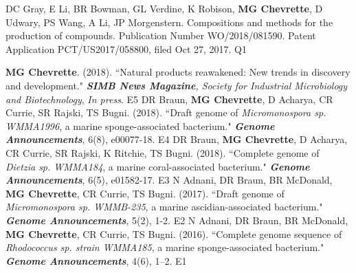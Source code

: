 
\begin{cvpubs}
  \cvpub
    {DC Gray, E Li, BR Bowman, GL Verdine, K Robison, \textbf{MG Chevrette}, D Udwary, PS Wang, A Li, JP Morgenstern. Compositions and methods for the production of compounds. Publication Number WO/2018/081590. Patent Application PCT/US2017/058800, filed Oct 27, 2017. \textbf{\textit{}} }  %
    {Q1} %
\end{cvpubs}


\begin{cvpubs}
  \cvpub
    {\textbf{MG Chevrette}. (2018). ``Natural products reawakened: New trends in discovery and development." \textit{\textbf{SIMB News Magazine}, Society for Industrial Microbiology and Biotechnology}, \textit{In press}. }  %
    {E5} %
  \cvpub
    {DR Braun, \textbf{MG Chevrette}, D Acharya, CR Currie, SR Rajski, TS Bugni. (2018). ``Draft genome of \textit{Micromonospora sp. WMMA1996}, a marine sponge-associated bacterium." \textit{\textbf{Genome Announcements}}, 6(8), e00077-18. \textbf{\textit{}} }  %
    {E4} %
  \cvpub
    {DR Braun, \textbf{MG Chevrette}, D Acharya, CR Currie, SR Rajski, K Ritchie, TS Bugni. (2018). ``Complete genome of \textit{Dietzia sp. WMMA184}, a marine coral-associated bacterium." \textit{\textbf{Genome Announcements}}, 6(5), e01582-17. \textbf{\textit{}} } %
    {E3} %
  \cvpub
    {N Adnani, DR Braun, BR McDonald, \textbf{MG Chevrette}, CR Currie, TS Bugni. (2017). ``Draft genome of \textit{Micromonospora sp. WMMB-235}, a marine ascidian-associated bacterium." \textit{\textbf{Genome Announcements}}, 5(2), 1-2. \textbf{\textit{}} } %
    {E2} %
  \cvpub
  {N Adnani, DR Braun, BR McDonald, \textbf{MG Chevrette}, CR Currie, TS Bugni. (2016). ``Complete genome sequence of \textit{Rhodococcus sp. strain WMMA185}, a marine sponge-associated bacterium." \textit{\textbf{Genome Announcements}}, 4(6), 1–2. \textbf{\textit{}}} %
    {E1} %
\end{cvpubs}

